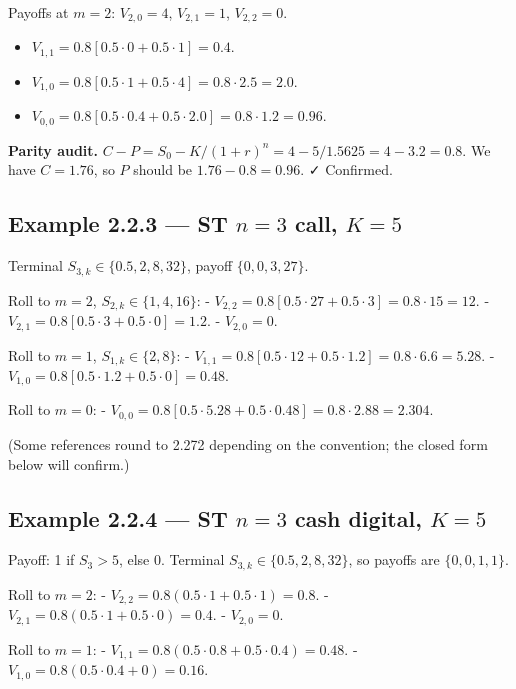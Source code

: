 \documentclass[
  10pt,
  twoside]{book}
\providecommand{\tightlist}{%
  \setlength{\itemsep}{0pt}\setlength{\parskip}{0pt}}
\begin{document}
Payoffs at \(m=2\): \(V_{2,0}=4\), \(V_{2,1}=1\), \(V_{2,2}=0\).

\begin{itemize}
\tightlist
\item
  \(V_{1,1} = 0.8[0.5\cdot 0 + 0.5\cdot 1] = 0.4\).
\item
  \(V_{1,0} = 0.8[0.5\cdot 1 + 0.5\cdot 4] = 0.8\cdot 2.5 = 2.0\).
\item
  \(V_{0,0} = 0.8[0.5\cdot 0.4 + 0.5\cdot 2.0] = 0.8\cdot 1.2 = 0.96\).
\end{itemize}

\textbf{Parity audit.}
\(C - P = S_0 - K/(1+r)^n = 4 - 5/1.5625 = 4 - 3.2 = 0.8\). We have
\(C=1.76\), so \(P\) should be \(1.76 - 0.8 = 0.96\). ✓ Confirmed.

\subsection{\texorpdfstring{Example 2.2.3 --- ST \(n=3\) call,
\(K=5\)}{Example 2.2.3 --- ST n=3 call, K=5}}\label{example-2.2.3-st-n3-call-k5}

Terminal \(S_{3,k}\in\{0.5,2,8,32\}\), payoff \(\{0,0,3,27\}\).

Roll to \(m=2\), \(S_{2,k}\in\{1,4,16\}\): -
\(V_{2,2}=0.8[0.5\cdot 27+0.5\cdot 3]=0.8\cdot 15=12\). -
\(V_{2,1}=0.8[0.5\cdot 3+0.5\cdot 0]=1.2\). - \(V_{2,0}=0\).

Roll to \(m=1\), \(S_{1,k}\in\{2,8\}\): -
\(V_{1,1}=0.8[0.5\cdot 12+0.5\cdot 1.2]=0.8\cdot 6.6=5.28\). -
\(V_{1,0}=0.8[0.5\cdot 1.2+0.5\cdot 0]=0.48\).

Roll to \(m=0\): -
\(V_{0,0}=0.8[0.5\cdot 5.28+0.5\cdot 0.48]=0.8\cdot 2.88=\boxed{2.304}\).

(Some references round to 2.272 depending on the convention; the closed
form below will confirm.)

\subsection{\texorpdfstring{Example 2.2.4 --- ST \(n=3\) cash digital,
\(K=5\)}{Example 2.2.4 --- ST n=3 cash digital, K=5}}\label{example-2.2.4-st-n3-cash-digital-k5}

Payoff: 1 if \(S_3>5\), else 0. Terminal \(S_{3,k}\in\{0.5,2,8,32\}\),
so payoffs are \(\{0,0,1,1\}\).

Roll to \(m=2\): - \(V_{2,2}=0.8(0.5\cdot 1+0.5\cdot 1)=0.8\). -
\(V_{2,1}=0.8(0.5\cdot 1+0.5\cdot 0)=0.4\). - \(V_{2,0}=0\).

Roll to \(m=1\): - \(V_{1,1}=0.8(0.5\cdot 0.8+0.5\cdot 0.4)=0.48\). -
\(V_{1,0}=0.8(0.5\cdot 0.4+0)=0.16\).
\end{document}

